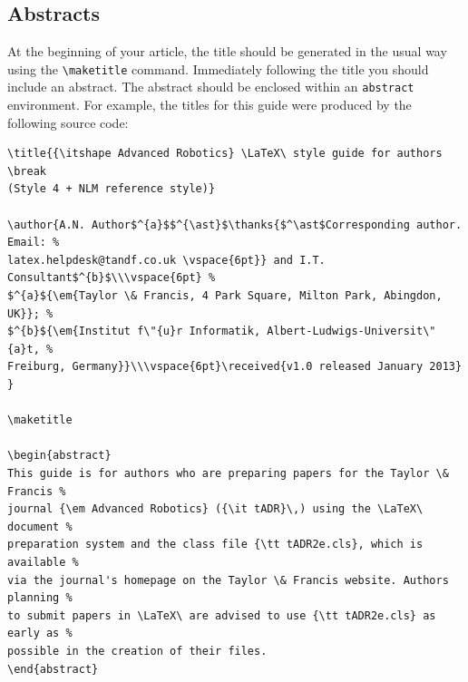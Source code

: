 \documentclass{tADR2e}
\begin{document}
\subsection{Abstracts}

At the beginning of your article, the title should be generated in the usual way using the {\verb"\maketitle"}
command. Immediately following the title you should include an abstract. The abstract should be enclosed within
an {\tt abstract} environment. For example, the titles for this guide were produced by the following source code:
%
\begin{verbatim}
\title{{\itshape Advanced Robotics} \LaTeX\ style guide for authors \break
(Style 4 + NLM reference style)}

\author{A.N. Author$^{a}$$^{\ast}$\thanks{$^\ast$Corresponding author. Email: %
latex.helpdesk@tandf.co.uk \vspace{6pt}} and I.T. Consultant$^{b}$\\\vspace{6pt} %
$^{a}${\em{Taylor \& Francis, 4 Park Square, Milton Park, Abingdon, UK}}; %
$^{b}${\em{Institut f\"{u}r Informatik, Albert-Ludwigs-Universit\"{a}t, %
Freiburg, Germany}}\\\vspace{6pt}\received{v1.0 released January 2013} }

\maketitle

\begin{abstract}
This guide is for authors who are preparing papers for the Taylor \& Francis %
journal {\em Advanced Robotics} ({\it tADR}\,) using the \LaTeX\ document %
preparation system and the class file {\tt tADR2e.cls}, which is available %
via the journal's homepage on the Taylor \& Francis website. Authors planning %
to submit papers in \LaTeX\ are advised to use {\tt tADR2e.cls} as early as %
possible in the creation of their files.
\end{abstract}
\end{verbatim}

\end{document}
